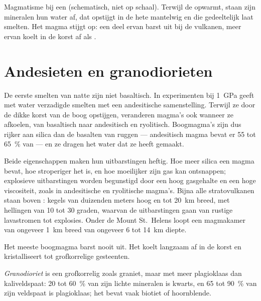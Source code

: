 \begin{omfigure}
{\small Magmatisme bij een  (schematisch, niet op schaal). Terwijl de 
opwarmt, staan zijn mineralen hun water af, dat opstijgt in de hete
mantelwig en die gedeeltelijk laat smelten. Het magma stijgt op: een deel ervan barst uit bij de
vulkanen, meer ervan koelt in de korst af als .}
\end{omfigure}

\section{Andesieten en granodiorieten}

De eerste smelten van natte  zijn niet basaltisch. In experimenten bij
\qty{1}{GPa} geeft met water verzadigde  smelten met een andesitische
samenstelling. Terwijl ze door de dikke korst van de boog opstijgen, veranderen magma's ook wanneer
ze afkoelen, van basaltisch naar andesitisch en ryolitisch. Boogmagma's zijn
dus rijker aan silica dan de basalten van ruggen --- andesitisch magma
bevat er 55 tot \qty{65}{\percent} van --- en ze dragen het water dat ze heeft
gemaakt.

Beide eigenschappen maken hun uitbarstingen heftig. Hoe meer silica een magma bevat,
hoe stroperiger het is, en hoe moeilijker zijn gas kan ontsnappen; explosieve
uitbarstingen worden begunstigd door een hoog gasgehalte en een hoge viscositeit, zoals in
andesitische en ryolitische magma's. Bijna alle stratovulkanen staan boven
: kegels van duizenden meters hoog en tot \qty{20}{km}
breed, met hellingen van 10 tot 30 graden, waarvan de uitbarstingen gaan van rustige
lavastromen tot explosies. Onder de Mount St.~Helens loopt een magmakamer van ongeveer \qty{1}{km} breed
van ongeveer 6 tot \qty{14}{km} diepte.

Het meeste boogmagma barst nooit uit. Het koelt langzaam af in de korst en kristalliseert
tot grofkorrelige gesteenten.

\begin{definition}[Granodioriet]\label{def:g12:subduction-magmatism:granodiorite}
\emph{Granodioriet} is een grofkorrelig 
zoals graniet, maar met meer plagioklaas dan kaliveldspaat: 20 tot
\qty{60}{\percent} van zijn lichte mineralen is kwarts, en 65 tot
\qty{90}{\percent} van zijn veldspaat is plagioklaas; het bevat vaak biotiet
of hoornblende.
\end{definition}

